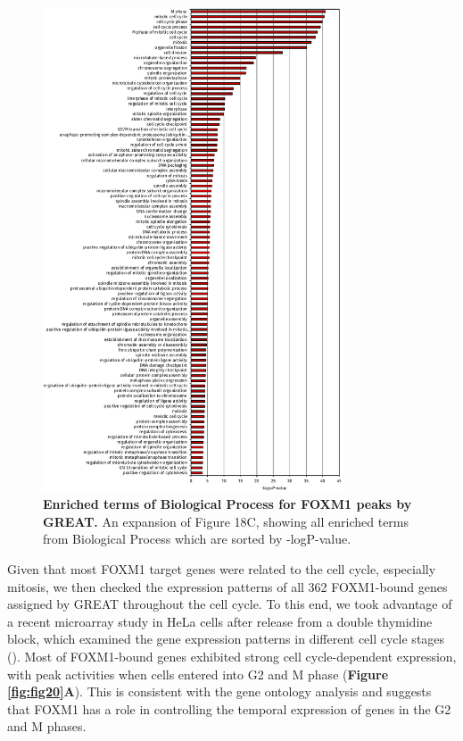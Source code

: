 \begin{figure}[!h]
    \centering
    \includegraphics[width=0.8\textwidth]{chapter3/figures_foxm1/fig19.pdf}
    \caption[Enriched terms of Biological Process for FOXM1 peaks by GREAT]{\textbf{Enriched terms of Biological Process for FOXM1 peaks by GREAT.} An expansion of Figure 18C, showing all enriched terms from Biological Process which are sorted by -logP-value.}
    \label{fig:fig19}
\end{figure}

Given that most FOXM1 target genes were related to the cell cycle, especially mitosis, we then checked the expression patterns of all 362 FOXM1-bound genes assigned by GREAT throughout the cell cycle. To this end, we took advantage of a recent microarray study in HeLa cells after release from a double thymidine block, which examined the gene expression patterns in different cell cycle stages (\cite{sadasivam2012the}). Most of FOXM1-bound genes exhibited strong cell cycle-dependent expression, with peak activities when cells entered into G2 and M phase (\textbf{Figure \ref{fig:fig20}A}). This is consistent with the gene ontology analysis and suggests that FOXM1 has a role in controlling the temporal expression of genes in the G2 and M phases.

